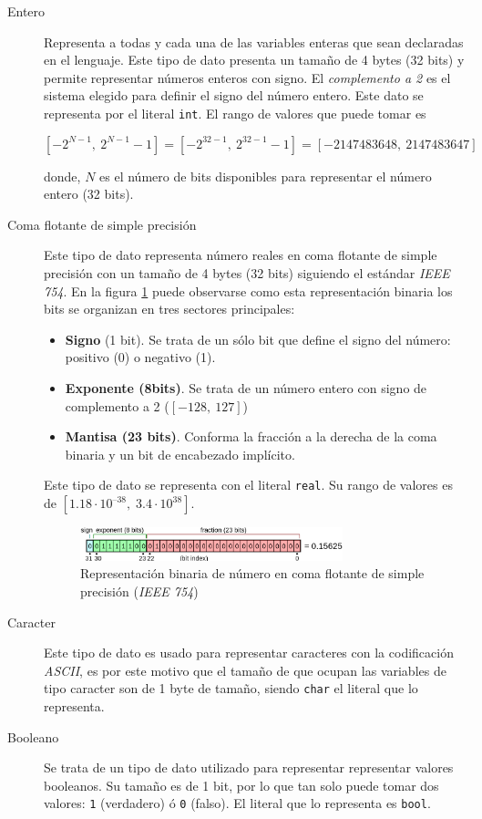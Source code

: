 \documentclass[11pt, english]{article}
\begin{document}
	\begin{description}
		\item[Entero] Representa a todas y cada una de las variables enteras que sean declaradas en el lenguaje. Este tipo de dato presenta un tamaño de 4 bytes (32 bits) y permite representar números enteros con signo. El \emph{complemento a 2} es el sistema elegido para definir el signo del número entero. Este dato se representa por el literal \texttt{int}. El rango de valores que puede tomar es
		
		\begin{equation}\label{eq:equation1}
		\left [-2^{N-1},\: 2^{N-1}-1 \right ] = \left [-2^{32-1},\: 2^{32-1}-1 \right] = \left [-2147483648,\: 2147483647 \right]
		\end{equation}
		
		donde, $N$ es el número de bits disponibles para representar el número entero (32 bits).
		\item[Coma flotante de simple precisión] Este tipo de dato representa número reales en coma flotante de simple precisión con un tamaño de 4 bytes (32 bits) siguiendo el estándar \emph{IEEE 754}. En la figura \ref{fig:figure1} puede observarse como esta representación binaria los bits se organizan en tres sectores principales:
		\begin{itemize}
			\item \textbf{Signo} (1 bit). Se trata de un sólo bit que define el signo del número: positivo (0) o negativo (1).
			\item  \textbf{Exponente (8bits)}. Se trata de un número entero con signo de complemento a 2 ($\left [ -128,\: 127\right ]$)
			\item \textbf{Mantisa (23 bits)}. Conforma la fracción a la derecha de la coma binaria y un bit de encabezado implícito.
		\end{itemize}
		Este tipo de dato se representa con el literal \texttt{real}. Su rango de valores es de $\left [ 1.18 \cdot 10^{–38},\; 3.4 \cdot 10^{38} \right ]$.
		\begin{figure}[H]\label{fig:figure1}
			\centering
			\includegraphics[width=0.75\textwidth]{../res/pics/data-types/float_diag.png}
			\caption{Representación binaria de número en coma flotante de simple precisión (\emph{IEEE 754})}
		\end{figure}
		
		\item[Caracter] Este tipo de dato es usado para representar caracteres con la codificación \emph{ASCII}, es por este motivo que el tamaño de que ocupan las variables de tipo caracter son de 1 byte de tamaño, siendo \texttt{char} el literal que lo representa.
		\item[Booleano] Se trata de un tipo de dato utilizado para representar representar valores booleanos. Su tamaño es de 1 bit, por lo que tan solo puede tomar dos valores: \texttt{1} (verdadero) ó \texttt{0} (falso). El literal que lo representa es \texttt{bool}.
	\end{description}
	
\end{document}
